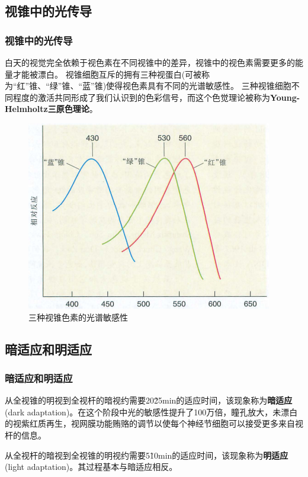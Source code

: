 \subsection{视锥中的光传导}
\begin{frame}
    \frametitle{视锥中的光传导}

    白天的视觉完全依赖于视色素在不同视锥中的差异，视锥中的视色素需要更多的能量才能被漂白。
    视锥细胞互斥的拥有三种视蛋白(可被称为“红”锥、“绿”锥、“蓝”锥)使得视色素具有不同的光谱敏感性。
    三种视锥细胞不同程度的激活共同形成了我们认识到的色彩信号，而这个色觉理论被称为\textbf{Young-Helmholtz三原色理论}。
    \begin{figure}
        \centering
        \includegraphics[height=.4\textheight]{img/pic5-3.png}
        \caption{三种视锥色素的光谱敏感性\label{pic5-3}}
    \end{figure}
\end{frame}

\subsection{暗适应和明适应}
\begin{frame}
    \frametitle{暗适应和明适应}

    从全视锥的明视到全视杆的暗视约需要20\~25min的适应时间，该现象称为\textbf{暗适应}(dark adaptation)。在这个阶段中光的敏感性提升了100万倍，瞳孔放大，未漂白的视紫红质再生，视网膜功能贿赂的调节以使每个神经节细胞可以接受更多来自视杆的信息。

    从全视杆的暗视到全视锥的明视约需要5\~10min的适应时间，该现象称为\textbf{明适应}(light adaptation)。其过程基本与暗适应相反。

\end{frame}